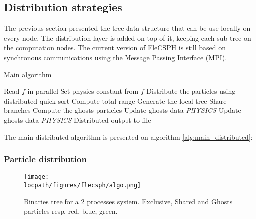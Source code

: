 \subsection{Distribution strategies}

The previous section presented the tree data structure that can be use locally on every node. 
The distribution layer is added on top of it, keeping each sub-tree on the computation nodes. 
The current version of FleCSPH is still based on synchronous communications using the Message Passing Interface (MPI). 

\begin{algorithm}
\caption{Main algorithm}\label{alg:main_distributed}
\begin{algorithmic}[1]
\State Read $f$ in parallel 
\State Set physics constant from $f$
\State Distribute the particles using distributed quick sort\label{alg_main:qsort}
\State Compute total range 
\State Generate the local tree
\State Share branches\label{alg_main:share_branches}
\State Compute the ghosts particles\label{alg_main:cp_ghosts}
\State Update ghosts data\label{alg_main:up_ghosts}
\State \textit{PHYSICS}
\State Update ghosts data
\State \textit{PHYSICS}
\State Distributed output to file 
\EndWhile
\EndProcedure
\end{algorithmic}
\end{algorithm}


The main distributed algorithm is presented on algorithm \ref{alg:main_distributed}:

\subsubsection{Particle distribution}

\begin{figure*}
\centering
\texttt{[image: \\locpath/figures/flecsph/algo.png]}
\caption{Binaries tree for a 2 processes system. Exclusive, Shared and Ghosts particles resp. red, blue, green.}
\label{fig:big_tree}
\end{figure*}


